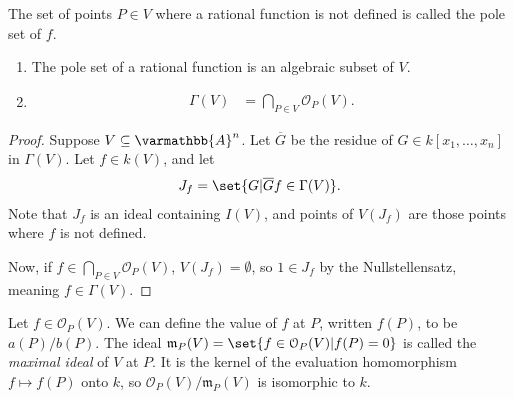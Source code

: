 \documentclass[10pt]{mypackage}
\renewcommand*{\mathbb}[1]{\varmathbb{#1}}
\newcommand{\A}{\mathbb{A}}
\begin{document}
The set of points $P\in V$ where a rational function is not defined is called the pole set of $f$.
\begin{proposition}\hfill
  \begin{enumerate}[(1)]
    \item The pole set of a rational function is an algebraic subset of $V$.
    \item 
      \begin{align*}
        \Gamma\left( V \right) &= \bigcap_{P\in V}\mathcal{O}_{P}\left( V \right).
      \end{align*}
  \end{enumerate}
\end{proposition}
\begin{proof}
  Suppose $V\subseteq \A^n$. Let $ \overline{G} $ be the residue of $G\in k\left[ x_1,\dots,x_n \right]$ in $\Gamma(V)$. Let $f\in k(V)$, and let
  \begin{align*}
     J_f= \set{G | \overline{G}f\in \Gamma(V)}.
  \end{align*}
  Note that $J_f$ is an ideal containing $I(V)$, and points of $V\left(J_f\right)$ are those points where $f$ is not defined.\newline

  Now, if $f\in \bigcap_{P\in V}\mathcal{O}_P\left( V \right)$, $V\left(J_f\right) = \emptyset$, so $1\in J_f$ by the Nullstellensatz, meaning $f\in \Gamma(V)$.
\end{proof}
Let $f\in \mathcal{O}_P\left( V \right)$. We can define the value of $f$ at $P$, written $f(P)$, to be $a(P)/b(P)$. The ideal $\mathfrak{m}_P(V) = \set{f\in \mathcal{O}_P(V) | f(P) = 0}$ is called the \textit{maximal ideal} of $V$ at $P$. It is the kernel of the evaluation homomorphism $f\mapsto f(P)$ onto $k$, so $\mathcal{O}_P(V)/\mathfrak{m}_P(V)$ is isomorphic to $k$.\newline
\end{document}
